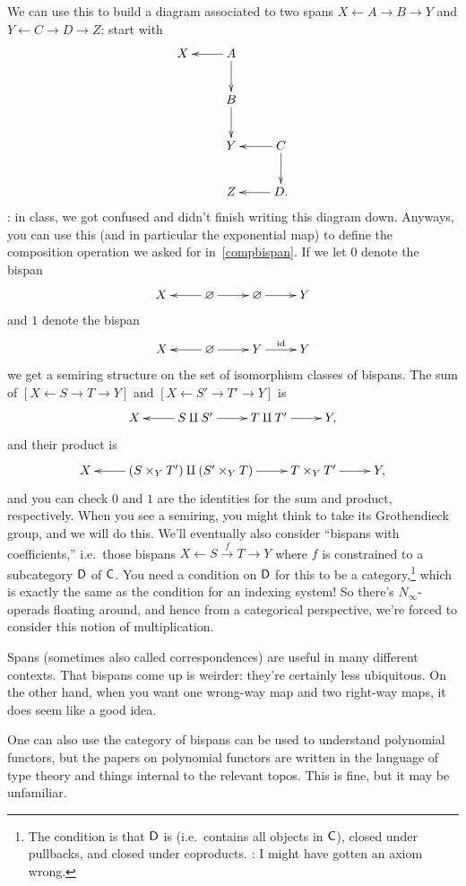 We can use this to build a diagram associated to two spans $X\gets A\to B\to Y$ and $Y\gets C\to D\to Z$: start
with
\begin{equation}
\label{snake}
\gathxy{
	X & A\ar[l]\ar[d]\\
	& B\ar[d]\\
	& Y & C\ar[l]\ar[d]\\
	& Z & D.\ar[l]
}
\end{equation}
\TODO: in class, we got confused and didn't finish writing this diagram down. Anyways, you can use this (and in
particular the exponential map) to define the composition operation we asked for in~\eqref{compbispan}.
If we let $0$ denote the bispan
\[\xymatrix{
	X & \emptyset\ar[l]\ar[r] & \emptyset\ar[r] & Y
}\]
and $1$ denote the bispan
\[\xymatrix{
	X & \emptyset\ar[l]\ar[r] & Y\ar[r]^\id & Y
}\]
we get a semiring structure on the set of isomorphism classes of bispans. The sum of $[X\gets S\to T\to Y]$ and
$[X\gets S'\to T'\to Y]$ is
\[\xymatrix{
	X & S\amalg S'\ar[l]\ar[r] & T\amalg T'\ar[r] & Y,
}\]
and their product is
\[\xymatrix{
	X & (S\times_Y T') \amalg (S'\times_Y T)\ar[l]\ar[r] & T\times_Y T'\ar[r] & Y,
}\]
and you can check $0$ and $1$ are the identities for the sum and product, respectively. When you see a semiring,
you might think to take its Grothendieck group, and we will do this. We'll eventually also consider ``bispans with
coefficients,'' i.e.\ those bispans $X\gets S\stackrel f\to T\to Y$ where $f$ is constrained to a subcategory $\mathsf D$
of $\mathsf C$. You need a condition on $\mathsf D$ for this to be a category,\footnote{The condition is that $\mathsf D$ is
 (i.e.\ contains all objects in $\mathsf C$), closed under pullbacks, and closed
under coproducts. \TODO: I might have gotten an axiom wrong.} which is exactly the same as the condition for an
indexing system! So there's $N_\infty$-operads floating around, and hence from a categorical perspective, we're
forced to consider this notion of multiplication.

\begin{rem}
Spans (sometimes also called correspondences) are useful in many different contexts. That bispans come up is
weirder: they're certainly less ubiquitous. On the other hand, when you want one wrong-way map and two right-way
maps, it does seem like a good idea.
\end{rem}
One can also use the category of bispans can be used to understand polynomial functors, but the papers on
polynomial functors are written in the language of type theory and things internal to the relevant topos. This is
fine, but it may be unfamiliar.

